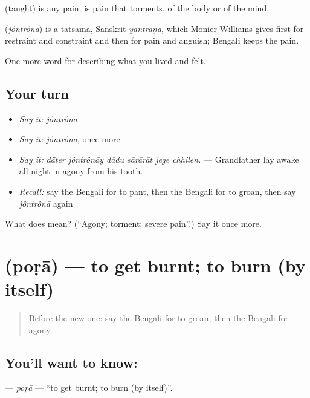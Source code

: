  (taught) is any pain;  is pain that torments, of the body or of the mind.

\begin{cousinweb}
\textbf{} (\emph{jôntrônā}) is a tatsama, Sanskrit \emph{yantraṇā}, which Monier-Williams gives first for restraint and constraint and then for pain and anguish; Bengali keeps the pain.
\end{cousinweb}

\begin{grammarlens}[title={What you've built}]
One more word for describing what you lived and felt.
\end{grammarlens}

\subsection*{Your turn}
\begin{itemize}
\raggedright
  \item \emph{Say it:} \emph{jôntrônā}
  \item \emph{Say it:} \emph{jôntrônā}, once more
  \item \emph{Say it:} \emph{dā̃ter jôntrônāy dādu sārārāt jege chhilen.} — Grandfather lay awake all night in agony from his tooth.
  \item \emph{Recall:} say the Bengali for to pant, then the Bengali for to groan, then say \emph{jôntrônā} again
\end{itemize}

\begin{tcolorbox}[breakable,colback=teal!4,colframe=teal!35!black,title={Before you move on}]
What does  mean? (\textquotedblleft{}Agony; torment; severe pain\textquotedblright{}.) Say it once more.
\end{tcolorbox}
\section[\texorpdfstring{\bn{পোড়া} (poṛā)}{পোড়া (poṛā)}]{ (poṛā) — to get burnt; to burn (by itself)}

\label{lesson:BN-C477-pora-burn}



\begin{quote}
Before the new one: say the Bengali for to groan, then the Bengali for agony.
\end{quote}

\subsection*{You'll want to know: }
\textbf{} — \emph{poṛā} — \textquotedblleft{}to get burnt; to burn (by itself)\textquotedblright{}.

